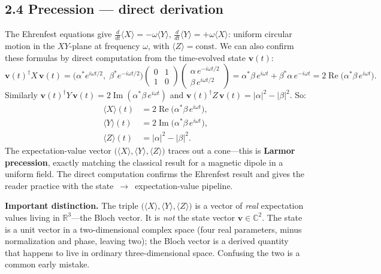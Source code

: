 \documentclass[12pt,a4paper]{article}
\begin{document}
\subsection{2.4 Precession --- direct derivation}
The Ehrenfest equations give $\frac{d}{dt}\langle X \rangle=-\omega\langle Y \rangle$, $\frac{d}{dt}\langle Y \rangle=+\omega\langle X \rangle$: uniform circular motion in the $XY$-plane at frequency $\omega$, with $\langle Z \rangle = \text{const}$.  We can also confirm these formulas by direct computation from the time-evolved state $\mathbf{v}(t)$:
\[
    \mathbf{v}(t)^\dagger X\,\mathbf{v}(t)
    = \bigl(\alpha^* e^{i\omega t/2},\;\beta^* e^{-i\omega t/2}\bigr)
    \begin{pmatrix}0&1\\1&0\end{pmatrix}
    \begin{pmatrix}\alpha\, e^{-i\omega t/2}\\\beta\, e^{i\omega t/2}\end{pmatrix}
    = \alpha^*\beta\,e^{i\omega t}+\beta^*\alpha\,e^{-i\omega t}
    = 2\operatorname{Re}\!\bigl(\alpha^*\beta\,e^{i\omega t}\bigr).
\]
Similarly $\mathbf{v}(t)^\dagger Y\,\mathbf{v}(t) = 2\operatorname{Im}(\alpha^*\beta\,e^{i\omega t})$ and $\mathbf{v}(t)^\dagger Z\,\mathbf{v}(t) = |\alpha|^2 - |\beta|^2$.  So:
\begin{align}
    \langle X \rangle(t) &= 2\operatorname{Re}\!\bigl(\alpha^*\beta\,e^{i\omega t}\bigr), \\
    \langle Y \rangle(t) &= 2\operatorname{Im}\!\bigl(\alpha^*\beta\,e^{i\omega t}\bigr), \\
    \langle Z \rangle(t) &= |\alpha|^2 - |\beta|^2.
\end{align}
The expectation-value vector $\bigl(\langle X \rangle,\langle Y \rangle,\langle Z \rangle\bigr)$ traces out a cone---this is \textbf{Larmor precession}, exactly matching the classical result for a magnetic dipole in a uniform field.  The direct computation confirms the Ehrenfest result and gives the reader practice with the state~$\to$~expectation-value pipeline.

\medskip
\noindent\textbf{Important distinction.}  The triple $\bigl(\langle X\rangle,\langle Y\rangle,\langle Z\rangle\bigr)$ is a vector of \emph{real} expectation values living in $\mathbb{R}^3$---the Bloch vector.  It is \emph{not} the state vector $\mathbf{v}\in\mathbb{C}^2$.  The state is a unit vector in a two-dimensional complex space (four real parameters, minus normalization and phase, leaving two); the Bloch vector is a derived quantity that happens to live in ordinary three-dimensional space.  Confusing the two is a common early mistake.
\end{document}

